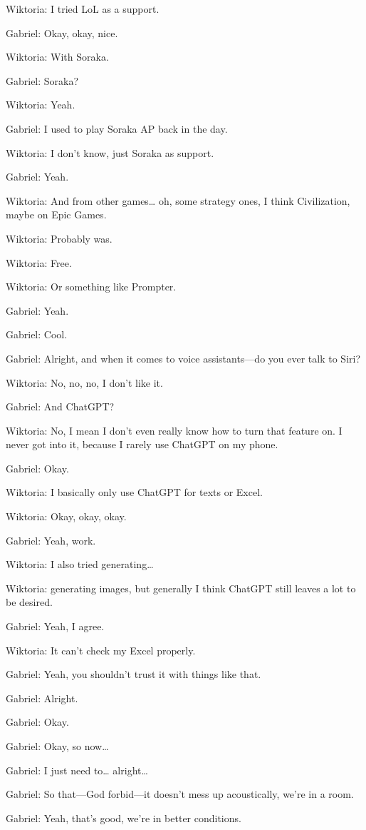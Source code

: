 Wiktoria: I tried LoL as a support.

Gabriel: Okay, okay, nice.

Wiktoria: With Soraka.

Gabriel: Soraka?

Wiktoria: Yeah.

Gabriel: I used to play Soraka AP back in the day.

Wiktoria: I don’t know, just Soraka as support.

Gabriel: Yeah.

Wiktoria: And from other games… oh, some strategy ones, I think Civilization, maybe on Epic Games.

Wiktoria: Probably was.

Wiktoria: Free.

Wiktoria: Or something like Prompter.

Gabriel: Yeah.

Gabriel: Cool.

Gabriel: Alright, and when it comes to voice assistants—do you ever talk to Siri?

Wiktoria: No, no, no, I don’t like it.

Gabriel: And ChatGPT?

Wiktoria: No, I mean I don’t even really know how to turn that feature on. I never got into it, because I rarely use ChatGPT on my phone.

Gabriel: Okay.

Wiktoria: I basically only use ChatGPT for texts or Excel.

Wiktoria: Okay, okay, okay.

Gabriel: Yeah, work.

Wiktoria: I also tried generating…

Wiktoria: generating images, but generally I think ChatGPT still leaves a lot to be desired.

Gabriel: Yeah, I agree.

Wiktoria: It can’t check my Excel properly.

Gabriel: Yeah, you shouldn’t trust it with things like that.

Gabriel: Alright.

Gabriel: Okay.

Gabriel: Okay, so now…

Gabriel: I just need to… alright…

Gabriel: So that—God forbid—it doesn’t mess up acoustically, we’re in a room.

Gabriel: Yeah, that’s good, we’re in better conditions.

